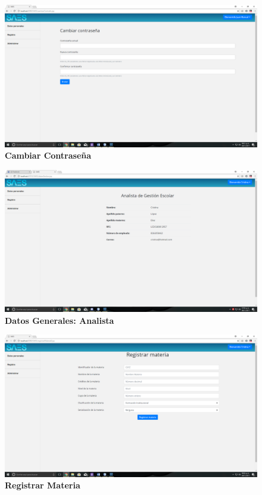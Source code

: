 \begin{figure}[H]
  \centering
    \includegraphics[scale=0.2]{project/images/14.png}
  \caption{\textbf{Cambiar Contraseña}}
\end{figure}
\begin{figure}[H]
  \centering
    \includegraphics[scale=0.15]{project/images/51.png}
  \caption{\textbf{Datos Generales: Analista}}
\end{figure}
\begin{figure}[H]
  \centering
    \includegraphics[scale=0.2]{project/images/36.png}
  \caption{\textbf{Registrar Materia}}
\end{figure}
